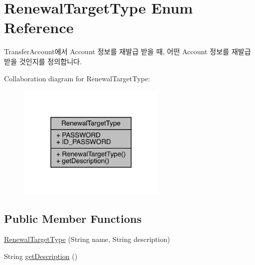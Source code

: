 \hypertarget{enumcom_1_1toast_1_1android_1_1gamebase_1_1auth_1_1transfer_1_1data_1_1_renewal_target_type}{}\section{Renewal\+Target\+Type Enum Reference}
\label{enumcom_1_1toast_1_1android_1_1gamebase_1_1auth_1_1transfer_1_1data_1_1_renewal_target_type}


Transfer\+Account에서 Account 정보를 재발급 받을 때, 어떤 Account 정보를 재발급 받을 것인지를 정의합니다.  




Collaboration diagram for Renewal\+Target\+Type\+:
\nopagebreak
\begin{figure}[H]
\begin{center}
\leavevmode
\includegraphics[width=200pt]{enumcom_1_1toast_1_1android_1_1gamebase_1_1auth_1_1transfer_1_1data_1_1_renewal_target_type__coll__graph}
\end{center}
\end{figure}
\subsection*{Public Member Functions}
\begin{DoxyCompactItemize}
\item 
\hyperlink{enumcom_1_1toast_1_1android_1_1gamebase_1_1auth_1_1transfer_1_1data_1_1_renewal_target_type_a0f31b31c6017ff20d4748dbee739c357}{Renewal\+Target\+Type} (String name, String description)
\item 
String \hyperlink{enumcom_1_1toast_1_1android_1_1gamebase_1_1auth_1_1transfer_1_1data_1_1_renewal_target_type_ac7feffb7a33f63504ff1f87f19e2d2d8}{get\+Description} ()
\end{DoxyCompactItemize}
